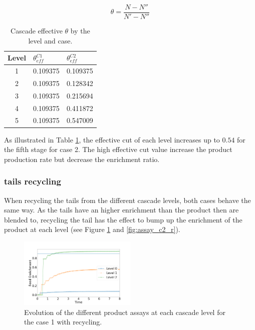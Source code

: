 \documentclass{anstrans}
\begin{document}
\begin{equation}\label{eq:theta_eff}
    \theta = \dfrac{N - N''}{N'-N''}
\end{equation}

\begin{table}[htb]
\centering
\begin{tabular}{cll}
\toprule

Level   &  $\theta_{eff}^{C1}$   & $\theta_{eff}^{C2}$ \\
\midrule
1       & 0.109375               & 0.109375     \\
2       & 0.109375               & 0.128342     \\
3       & 0.109375               & 0.215694     \\
4       & 0.109375               & 0.411872     \\
5       & 0.109375               & 0.547009     \\

\bottomrule
\end{tabular}
  \caption{Cascade effective $\theta$ by the level and case.}
  \label{tab:cascade_theta}
\end{table}
As illustrated in Table \ref{tab:cascade_theta}, the effective cut
of each level increases up to $0.54$ for the fifth stage for case 2. The high
effective cut value increase the product production rate but decrease the
enrichment ratio.

\subsubsection{tails recycling}
When recycling the tails from the different cascade levels, both cases behave
the same way. As the tails have an higher enrichment than the product then are
blended to, recycling the tail has the effect to bump up the enrichment of the
product at each level (see Figure \ref{fig:assay_c1_r} and \ref{fig:assay_c2_r}).

\begin{figure}[ht] %
  \centering
  \includegraphics[width=0.5\textwidth]{assay_case_1_rec.png}
  \caption{Evolution of the different product assays at each cascade level for
  the case 1 with recycling. }\label{fig:assay_c1_r}
\end{figure}
\end{document}
